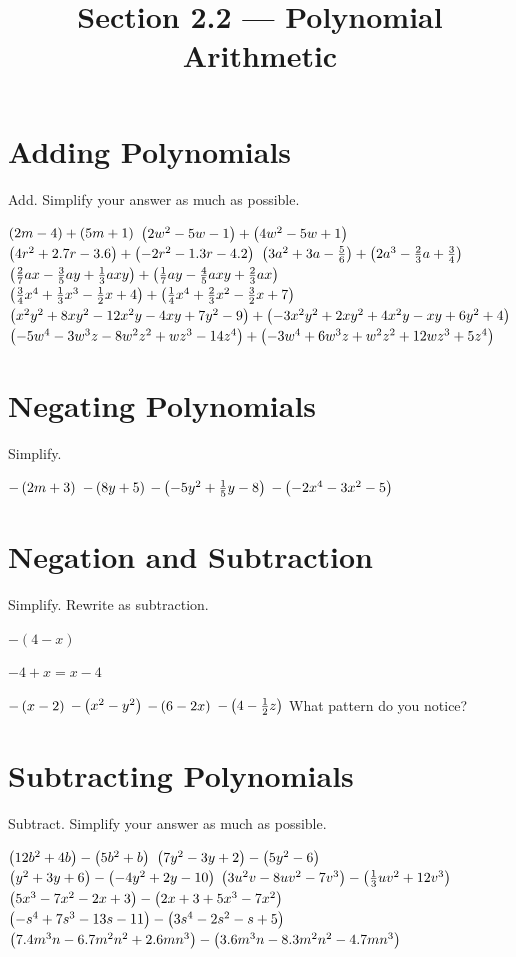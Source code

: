 

\title{Section 2.2 --- Polynomial Arithmetic}


\maketitle

\section*{Adding Polynomials}
Add.  Simplify your answer as much as possible.
\begin{smenum}
\mitemxx
{$\left(2m-4\right)+\left(5m+1\right)$}
{$\left(2w^2-5w-1\right)+\left(4w^2-5w+1\right)$}
\mitemxx
{$\left(4r^2+2.7r-3.6\right)+\left(-2r^2-1.3r-4.2\right)$}
{$\left(3a^2+3a-\frac{5}{6}\right)+\left(2a^3-\frac{2}{3}a+\frac{3}{4}\right)$}
\mitemxx
{$\left(\frac{2}{7}ax-\frac{3}{5}ay+\frac{1}{3}axy\right)+\left(\frac{1}{7}ay-\frac{4}{5}axy+\frac{2}{3}ax\right)$}
{$\left(\frac{3}{4}x^4+\frac{1}{3}x^3-\frac{1}{2}x+4\right)+\left(\frac{1}{4}x^4+\frac{2}{3}x^2-\frac{3}{2}x+7\right)$}
\mitemx
{$\left(x^2y^2+8xy^2-12x^2y-4xy+7y^2-9\right)+\left(-3x^2y^2+2xy^2+4x^2y-xy+6y^2+4\right)$}
\mitemx
{$\left(-5w^4-3w^3z-8w^2z^2+wz^3-14z^4\right)+\left(-3w^4+6w^3z+w^2z^2+12wz^3+5z^4\right)$}
\end{smenum}

\section*{Negating Polynomials}
Simplify.
\begin{smenum}
\mitemxxxx
{$-\left(2m+3\right)$}
{$-\left(8y+5\right)$}
{$-\left(-5y^2+\frac{1}{5}y-8\right)$}
{$-\left(-2x^4-3x^2-5\right)$}
\end{smenum}

\section*{Negation and Subtraction}
Simplify.  Rewrite as subtraction.
\begin{description}
\setlength{\topsep}{0pt}%
\setlength{\itemsep}{0pt}%
\item[Example] $-(4-x)$
\item[Solution] $-4+x=x-4$
\end{description}
\begin{smenum}
\mitemxxxx
{$-\left(x-2\right)$}
{$-\left(x^2-y^2\right)$}
{$-\left(6-2x\right)$}
{$-\left(4-\frac{1}{2}z\right)$}
\mitemx
{What pattern do you notice?}
\end{smenum}

\section*{Subtracting Polynomials}
Subtract.  Simplify your answer as much as possible.
\begin{smenum}
\mitemxx
{$\left(12b^2+4b\right)-\left(5b^2+b\right)$}
{$\left(7y^2-3y+2\right)-\left(5y^2-6\right)$}
\mitemxx
{$\left(y^2+3y+6\right)-\left(-4y^2+2y-10\right)$}
{$\left(3u^2v-8uv^2-7v^3\right)-\left(\frac{1}{3}uv^2+12v^3\right)$}
\mitemxx
{$\left(5x^3-7x^2-2x+3\right)-\left(2x+3+5x^3-7x^2\right)$}
{$\left(-s^4+7s^3-13s-11\right)-\left(3s^4-2s^2-s+5\right)$}
\mitemx
{$\left(7.4m^3n-6.7m^2n^2+2.6mn^3\right)-\left(3.6m^3n-8.3m^2n^2-4.7mn^3\right)$}
\end{smenum}

